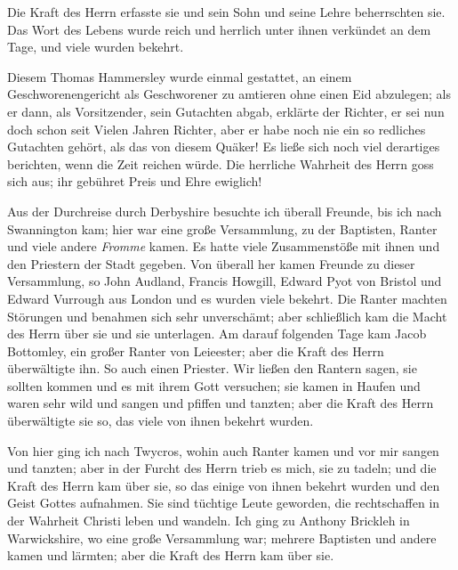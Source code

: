 Die Kraft des Herrn erfasste sie und sein
Sohn und seine Lehre beherrschten sie. Das Wort des Lebens
wurde reich und herrlich unter ihnen verkündet an dem Tage,
und viele wurden bekehrt.


Diesem Thomas Hammersley
wurde einmal gestattet, an
einem Geschworenengericht als Geschworener zu amtieren ohne
einen Eid abzulegen; als er dann, als 
Vorsitzender, sein Gutachten abgab, erklärte der Richter, 
er sei nun doch schon seit Vielen
Jahren Richter, aber er habe noch nie ein so redliches Gutachten
gehört, als das von diesem Quäker! Es ließe sich noch viel
derartiges berichten, wenn die Zeit reichen würde. Die herrliche
Wahrheit des Herrn goss sich aus; ihr gebühret Preis und Ehre
ewiglich!


Aus der Durchreise durch Derbyshire besuchte ich überall
Freunde, bis ich nach Swannington kam; hier war eine große
Versammlung, zu der Baptisten, 
Ranter und viele andere \textit{Fromme}
kamen. Es hatte viele Zusammenstöße mit ihnen und den Priestern
der Stadt gegeben. Von überall her kamen Freunde zu dieser
Versammlung, so John Audland, 
Francis Howgill, Edward 
Pyot von Bristol und Edward 
Vurrough aus London und es wurden
viele bekehrt. Die Ranter machten Störungen 
 und benahmen sich
sehr unverschämt; aber schließlich kam die Macht des Herrn über
sie und sie unterlagen. Am darauf folgenden Tage kam Jacob
Bottomley, ein großer Ranter 
von Leieester; aber die Kraft des
Herrn überwältigte ihn. So auch einen Priester. Wir ließen
den Rantern sagen, sie sollten kommen
 und es mit ihrem Gott
versuchen; sie kamen in Haufen und waren sehr wild und sangen
und pfiffen und tanzten; aber die Kraft des 
Herrn überwältigte
sie so, das viele von ihnen bekehrt wurden.



Von hier ging ich nach Twycros, wohin auch Ranter kamen
und vor mir sangen und tanzten; aber in der Furcht des Herrn
trieb es mich, sie zu tadeln; und die Kraft des Herrn kam über sie,
so das einige von ihnen bekehrt wurden und den Geist Gottes
aufnahmen. Sie sind tüchtige Leute geworden, die rechtschaffen
in der Wahrheit Christi leben und wandeln. Ich ging zu Anthony
Brickleh in 
Warwickshire, wo eine große 
Versammlung war;
mehrere Baptisten und andere kamen und lärmten; 
aber die Kraft des Herrn kam über sie.

